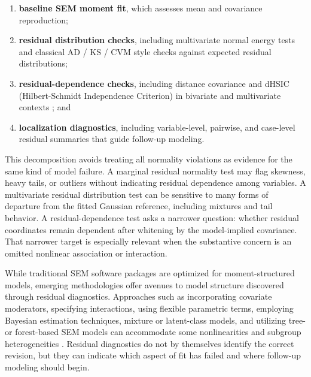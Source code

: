 \documentclass[floatsintext,a4paper]{apa7} %
\begin{document}
	\begin{enumerate}
		\item \textbf{baseline SEM moment fit}, which assesses mean and covariance reproduction;
		\item \textbf{residual distribution checks}, including multivariate normal energy tests \citep{rizzo2016energy} and classical AD / KS / CVM style checks against expected residual distributions;
		\item \textbf{residual-dependence checks}, including distance covariance and dHSIC (Hilbert-Schmidt Independence Criterion) in bivariate and multivariate contexts \citep{pfister2018kernelbased}; and
		\item \textbf{localization diagnostics}, including variable-level, pairwise, and case-level residual summaries that guide follow-up modeling.
	\end{enumerate}
	
	This decomposition avoids treating all normality violations as evidence for the same kind of model failure. A marginal residual normality test may flag skewness, heavy tails, or outliers without indicating residual dependence among variables. A multivariate residual distribution test can be sensitive to many forms of departure from the fitted Gaussian reference, including mixtures and tail behavior. A residual-dependence test asks a narrower question: whether residual coordinates remain dependent after whitening by the model-implied covariance. That narrower target is especially relevant when the substantive concern is an omitted nonlinear association or interaction.
	
	While traditional SEM software packages are optimized for moment-structured models, emerging methodologies offer avenues to model structure discovered through residual diagnostics. Approaches such as incorporating covariate moderators, specifying interactions, using flexible parametric terms, employing Bayesian estimation techniques, mixture or latent-class models, and utilizing tree- or forest-based SEM models can accommodate some nonlinearities and subgroup heterogeneities \citep{mcdonald1962general,klein2000maximum,irmer2024estimating,cox2025comparing,lubke2005investigating,brandmaier2013structural,briley2015nonparametric,arnold2021score,silvaDiaz2025evaluation,muthen2012bayesian,garnierVillarreal2020adapting}. Residual diagnostics do not by themselves identify the correct revision, but they can indicate which aspect of fit has failed and where follow-up modeling should begin.
	
\end{document}
